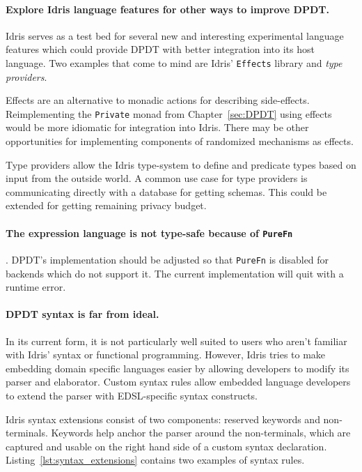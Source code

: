 \documentclass[12pt]{report}
\begin{document}
\paragraph{Explore Idris language features for other ways to improve DPDT.}
Idris serves as a test bed for several new and interesting experimental language features which could provide DPDT with better integration into its host language.
Two examples that come to mind are Idris' \texttt{Effects} library and \textit{type providers}.

Effects are an alternative to monadic actions for describing side-effects.
Reimplementing the \texttt{Private} monad from Chapter~\ref{sec:DPDT} using effects would be more idiomatic for integration into Idris.
There may be other opportunities for implementing components of randomized mechanisms as effects.

Type providers allow the Idris type-system to define and predicate types based on input from the outside world.
A common use case for type providers is communicating directly with a database for getting schemas.
This could be extended for getting remaining privacy budget.

\paragraph{The expression language is not type-safe because of \texttt{PureFn}}.
DPDT's implementation should be adjusted so that \texttt{PureFn} is disabled for backends which do not support it.
The current implementation will quit with a runtime error.


\paragraph{DPDT syntax is far from ideal.}
In its current form, it is not particularly well suited to users who aren't familiar with Idris' syntax or functional programming.
However, Idris tries to make embedding domain specific languages easier by allowing developers to modify its parser and elaborator.
Custom syntax rules allow embedded language developers to extend the parser with EDSL-specific syntax constructs.

Idris syntax extensions consist of two components: reserved keywords and non-terminals.
Keywords help anchor the parser around the non-terminals, which are captured and usable on the right hand side of a custom syntax declaration.
Listing~\ref{lst:syntax_extensions} contains two examples of syntax rules.
\end{document}
